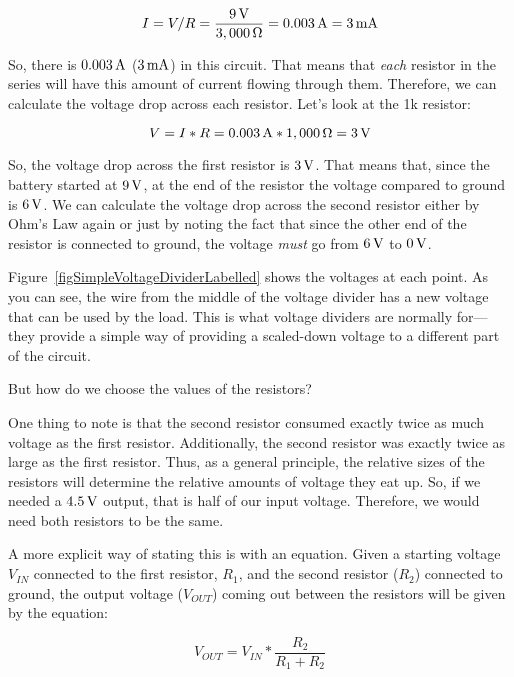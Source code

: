 $$ I = V / R = \frac{9\,\si{\volt}}{3,000\,\si{\ohm}} = 0.003\,\si{\ampere} = 3\,\si{\milli\ampere} $$

So, there is $0.003\,\si{\ampere}$ ($3\,\si{\milli\ampere}$) in this circuit.
That means that \emph{each} resistor in the series will have this amount of current flowing through them.
Therefore, we can calculate the voltage drop across each resistor.
Let's look at the 1k resistor:

$$ V = I * R = 0.003\,\si{\ampere} * 1,000\,\si{\ohm} = 3\,\si{\volt} $$

So, the voltage drop across the first resistor is $3\,\si{\volt}$.
That means that, since the battery started at $9\,\si{\volt}$, at the end of the resistor the voltage compared to ground is $6\,\si{\volt}$.
We can calculate the voltage drop across the second resistor either by Ohm's Law again or just by noting the fact that since the other end of the resistor is connected to ground, the voltage \emph{must} go from $6\,\si{\volt}$ to $0\,\si{\volt}$.


Figure~\ref{figSimpleVoltageDividerLabelled} shows the voltages at each point.
As you can see, the wire from the middle of the voltage divider has a new voltage that can be used by the load.
This is what voltage dividers are normally for---they provide a simple way of providing a scaled-down voltage to a different part of the circuit.

But how do we choose the values of the resistors?

One thing to note is that the second resistor consumed exactly twice as much voltage as the first resistor.
Additionally, the second resistor was exactly twice as large as the first resistor.
Thus, as a general principle, the relative sizes of the resistors will determine the relative amounts of voltage they eat up.
So, if we needed a $4.5\,\si{\volt}$ output, that is half of our input voltage.
Therefore, we would need both resistors to be the same.

A more explicit way of stating this is with an equation.
Given a starting voltage $V_{IN}$ connected to the first resistor, $R_1$, and the second resistor ($R_2$) connected to ground, the output voltage ($V_{OUT}$) coming out between the resistors will be given by the equation:

\begin{equation}
\label{eqVoltageDivision}
V_{OUT} = V_{IN} * \frac{R_2}{R_1 + R_2}
\end{equation}

